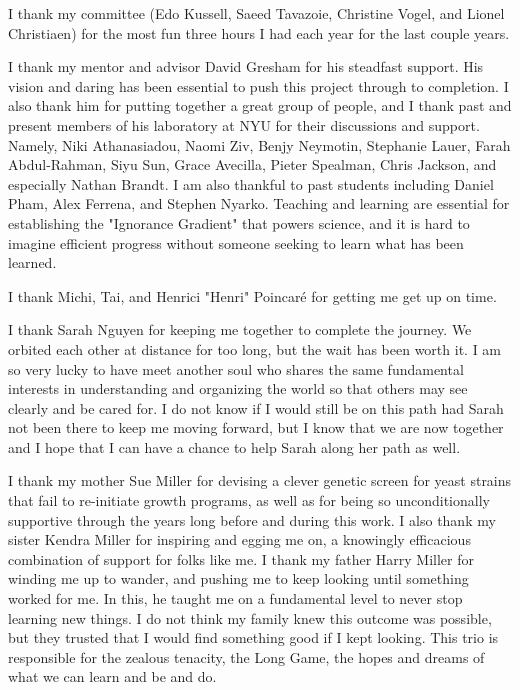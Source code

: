 \documentclass[12pt,letterpaper]{memoir}
\begin{document}
I thank my committee (Edo Kussell, Saeed Tavazoie, Christine Vogel,
and Lionel Christiaen) for the most fun three hours I had each year
for the last couple years.

I thank my mentor and advisor David Gresham for his steadfast
support. His vision and daring has been essential to push this 
project through to completion. I also thank him for putting together
a great group of people, and I thank past and present members of 
his laboratory at NYU for their discussions and support.
Namely, Niki Athanasiadou, Naomi Ziv, 
Benjy Neymotin, Stephanie Lauer, Farah Abdul-Rahman, Siyu Sun,
Grace Avecilla, Pieter Spealman, Chris Jackson,
and especially Nathan Brandt.
I am also thankful to past students including Daniel Pham, 
Alex Ferrena, and Stephen Nyarko. Teaching and learning are essential
for establishing the "Ignorance Gradient" that powers science, and it
is hard to imagine efficient progress without 
someone seeking to learn what has been learned.


I thank Michi, Tai, and Henrici "Henri" Poincar\'{e} 
for getting me get up on time.

I thank Sarah Nguyen for keeping me together to complete the journey.
We orbited each other at distance for too long, 
but the wait has been worth it.
I am so very lucky to have meet another soul who shares the same
fundamental interests in understanding and organizing the world so
that others may see clearly and be cared for. I do not know if I
would still be on this path had Sarah not been there to keep me
moving forward, but I know that we are now together and I hope that
I can have a chance to help Sarah along her path as well.

I thank my mother Sue Miller for devising a clever genetic screen 
for yeast strains that fail to re-initiate growth programs, 
as well as for being so unconditionally supportive through the years 
long before and during this work.
I also thank my sister Kendra Miller for inspiring and egging me on, 
a knowingly efficacious combination of support for folks like me.
I thank my father Harry Miller for winding me up to wander, 
and pushing me to keep looking until something worked for me. 
In this, he taught me on a fundamental level
to never stop learning new things. 
I do not think my family knew this outcome was possible, 
but they trusted that I would find something good if I kept looking. 
This trio is responsible for the zealous tenacity, the Long Game, 
the hopes and dreams of what we can learn
and be and do. 
\end{document}
